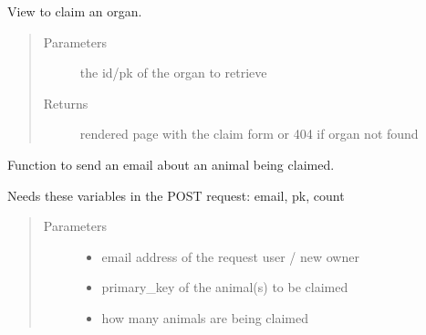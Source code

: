 \documentclass[letterpaper,10pt,openany,oneside,english]{sphinxmanual}
\begin{document}

\begin{fulllineitems}
\label{\detokenize{index:animals.views.claim_organ}}
View to claim an organ.
\begin{quote}\begin{description}
\item[{Parameters}] \leavevmode
{} \textendash{} the id/pk of the organ to retrieve

\item[{Returns}] \leavevmode
rendered page with the claim form
or 404 if organ not found

\end{description}\end{quote}

\end{fulllineitems}


\begin{fulllineitems}
\label{\detokenize{index:animals.views.send_email_animal}}
Function to send an email about an animal being claimed.

Needs these variables in the POST request: email, pk, count
\begin{quote}\begin{description}
\item[{Parameters}] \leavevmode\begin{itemize}
\item {} 
 \textendash{} email address of the request user / new owner

\item {} 
 \textendash{} primary\_key of the animal(s) to be claimed

\item {} 
 \textendash{} how many animals are being claimed

\end{itemize}

\end{description}\end{quote}

\end{fulllineitems}
\end{document}
